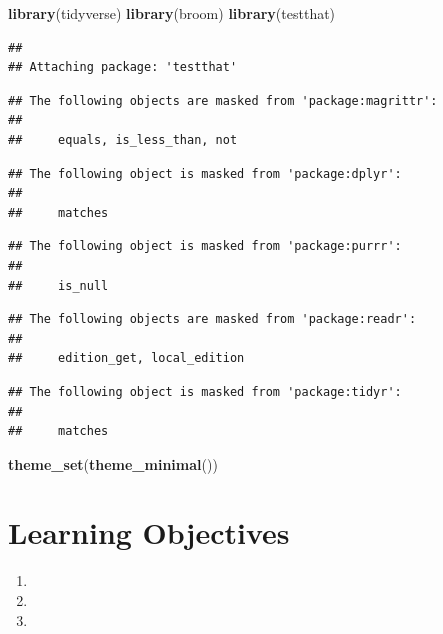 \documentclass[
]{book}
\newenvironment{Shaded}{\begin{snugshade}}{\end{snugshade}}
\newcommand{\FunctionTok}[1]{\textcolor[rgb]{0.13,0.29,0.53}{\textbf{#1}}}
\newcommand{\NormalTok}[1]{#1}
\providecommand{\tightlist}{%
  \setlength{\itemsep}{0pt}\setlength{\parskip}{0pt}}
\theoremstyle{definition}
\theoremstyle{definition}
\theoremstyle{definition}
\theoremstyle{definition}
\theoremstyle{remark}
\begin{document}
\begin{Shaded}
\begin{Highlighting}[]
\FunctionTok{library}\NormalTok{(tidyverse)}
\FunctionTok{library}\NormalTok{(broom)}
\FunctionTok{library}\NormalTok{(testthat)}
\end{Highlighting}
\end{Shaded}

\begin{verbatim}
## 
## Attaching package: 'testthat'
\end{verbatim}

\begin{verbatim}
## The following objects are masked from 'package:magrittr':
## 
##     equals, is_less_than, not
\end{verbatim}

\begin{verbatim}
## The following object is masked from 'package:dplyr':
## 
##     matches
\end{verbatim}

\begin{verbatim}
## The following object is masked from 'package:purrr':
## 
##     is_null
\end{verbatim}

\begin{verbatim}
## The following objects are masked from 'package:readr':
## 
##     edition_get, local_edition
\end{verbatim}

\begin{verbatim}
## The following object is masked from 'package:tidyr':
## 
##     matches
\end{verbatim}

\begin{Shaded}
\begin{Highlighting}[]
\FunctionTok{theme\_set}\NormalTok{(}\FunctionTok{theme\_minimal}\NormalTok{())}
\end{Highlighting}
\end{Shaded}

\section{Learning Objectives}\label{learning-objectives-7}

\begin{enumerate}
\def\labelenumi{\arabic{enumi}.}
\tightlist
\item
\item
\item
\end{enumerate}
\end{document}

